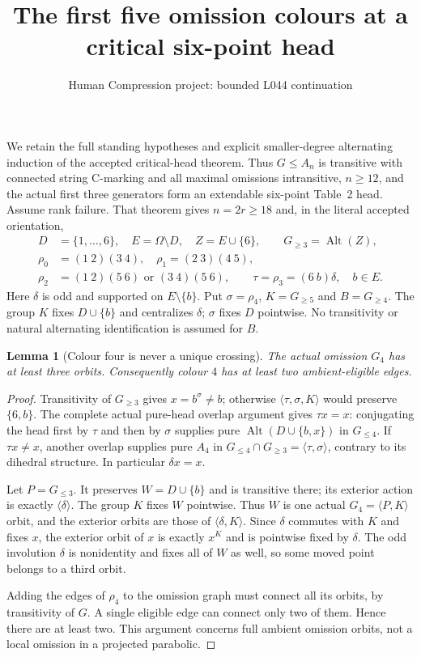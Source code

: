 \documentclass[11pt,a4paper]{article}
\title{The first five omission colours at a critical six-point head}
\author{Human Compression project: bounded L044 continuation}
\date{}
\newtheorem{lemma}{Lemma}
\newcommand{\gen}[1]{\langle#1\rangle}
\newcommand{\Alt}{\operatorname{Alt}}
\begin{document}
\maketitle
We retain the full standing hypotheses and explicit smaller-degree
alternating induction of the accepted critical-head theorem.
Thus $G\le A_n$ is transitive with connected string C-marking and
all maximal omissions intransitive, $n\ge12$, and the actual
first three generators form an extendable six-point Table~2 head.
Assume rank failure. That theorem gives $n=2r\ge18$ and, in the
literal accepted orientation,
\[
\begin{split}
 D&=\{1,\ldots,6\},\quad E=\Omega\setminus D,\quad Z=E\cup\{6\},\qquad
 G_{\ge3}=\Alt(Z),\\
 \rho_0&=(1\ 2)(3\ 4),\quad \rho_1=(2\ 3)(4\ 5),\\
 \rho_2&=(1\ 2)(5\ 6)\text{ or }(3\ 4)(5\ 6),\qquad
 \tau=\rho_3=(6\ b)\delta,\quad b\in E.
\end{split}
\]
Here $\delta$ is odd and supported on $E\setminus\{b\}$.
Put $\sigma=\rho_4$, $K=G_{\ge5}$ and $B=G_{\ge4}$.
The group $K$ fixes $D\cup\{b\}$ and centralizes $\delta$;
$\sigma$ fixes $D$ pointwise. No transitivity or natural alternating
identification is assumed for $B$.

\begin{lemma}[Colour four is never a unique crossing]
The actual omission $G_4$ has at least three orbits. Consequently
colour $4$ has at least two ambient-eligible edges.
\end{lemma}
\begin{proof}
Transitivity of $G_{\ge3}$ gives $x=b^\sigma\ne b$;
otherwise $\gen{\tau,\sigma,K}$ would preserve $\{6,b\}$.
The complete actual pure-head overlap argument gives $\tau x=x$:
conjugating the head first by $\tau$ and then by $\sigma$ supplies
pure $\Alt(D\cup\{b,x\})$ in $G_{\le4}$. If $\tau x\ne x$,
another overlap supplies pure $A_4$ in
$G_{\le4}\cap G_{\ge3}=\gen{\tau,\sigma}$, contrary to its
dihedral structure. In particular $\delta x=x$.

Let $P=G_{\le3}$. It preserves $W=D\cup\{b\}$ and is transitive
there; its exterior action is exactly $\gen\delta$.
The group $K$ fixes $W$ pointwise. Thus $W$ is one actual
$G_4=\gen{P,K}$ orbit, and the exterior orbits are those of
$\gen{\delta,K}$. Since $\delta$ commutes with $K$ and fixes $x$,
the exterior orbit of $x$ is exactly $x^K$ and is pointwise fixed
by $\delta$. The odd involution $\delta$ is nonidentity and fixes
all of $W$ as well, so some moved point belongs to a third orbit.

Adding the edges of $\rho_4$ to the omission graph must connect
all its orbits, by transitivity of $G$. A single eligible edge
can connect only two of them. Hence there are at least two.
This argument concerns full ambient omission orbits, not a local
omission in a projected parabolic.
\end{proof}
\end{document}
